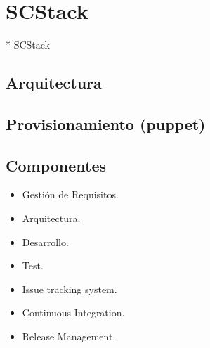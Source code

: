 \chapter{SCStack}
\label{chap:scstack}

* SCStack

\section{Arquitectura}
\label{sec:arquitectura}

\begin{comment}
Este punto sobre la arquitectura de la forja no me queda demasiado claro, es decir, no se definirla.

La arquitectura está definida en el documento de proyecto fin de carrera que te pasé. Básicamente la arquitectura está basada en un LDAP contra el que todas las demás herramientas de la forja se autentican. En tu caso, a esa arquitectura tienes que añadirle un Gerrit que gestiona repositorios git.
\end{comment}


\section{Provisionamiento (puppet)}
\label{sec:puppet}


\section{Componentes}
\label{sec:componentes}

\begin{comment}
Componentes, ¿ aquí se definirían las herramientas a instalar ?

Efectivamente, qué herramientas instala la forja (Se supone que las has descrito en la parte de procesos de desarrollo de forma genérica, aquí se dan nombres concretos). 
\end{comment}

\begin{itemize}
	\item Gesti\'on de Requisitos.
	\item Arquitectura.
	\item Desarrollo.
	\item Test.
	\item Issue tracking system.
	\item Continuous Integration.
	\item Release Management.
\end{itemize}


